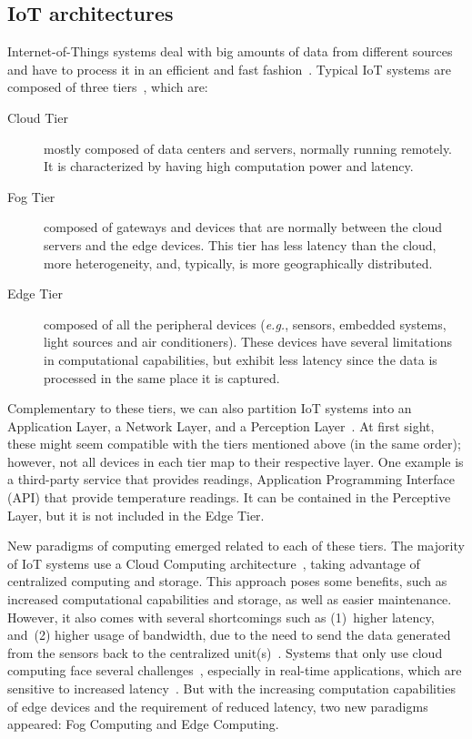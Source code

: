 \subsection{IoT architectures}\label{sec:architectures}

Internet-of-Things systems deal with big amounts of data from different sources and have to process it in an efficient and fast fashion~\cite{lin_survey}. Typical IoT systems are composed of three tiers~\cite{Yang2019}, which are:

\begin{description}
    \item[Cloud Tier] mostly composed of data centers and servers, normally running remotely. It is characterized by having high computation power and latency.
    \item[Fog Tier] composed of gateways and devices that are normally between the cloud servers and the edge devices. This tier has less latency than the cloud, more heterogeneity, and, typically, is more geographically distributed.
    \item[Edge Tier] composed of all the peripheral devices (\emph{e.g.}, sensors, embedded systems, light sources and air conditioners). These devices have several limitations in computational capabilities, but exhibit less latency since the data is processed in the same place it is captured.
\end{description}

Complementary to these tiers, we can also partition IoT systems into an Application Layer, a Network Layer, and a Perception Layer~\cite{iot_layers}. At first sight, these might seem compatible with the tiers mentioned above (in the same order); however, not all devices in each tier map to their respective layer. One example is a third-party service that provides readings, \eg Application Programming Interface (API) that provide temperature readings. It can be contained in the Perceptive Layer, but it is not included in the Edge Tier.

New paradigms of computing emerged related to each of these tiers. The majority of IoT systems use a Cloud Computing architecture~\cite{cisco}, taking advantage of centralized computing and storage. This approach poses some benefits, such as increased computational capabilities and storage, as well as easier maintenance. However, it also comes with several shortcomings such as (1)~higher latency, and~(2) higher usage of bandwidth, due to the need to send the data generated from the sensors back to the centralized unit(s)~\cite{connecting_fog_and_cloud}. Systems that only use cloud computing face several challenges~\cite{aazam2014cloud}, especially in real-time applications, which are sensitive to increased latency~\cite{latency_critical,EUC2018}. But with the increasing computation capabilities of edge devices and the requirement of reduced latency, two new paradigms appeared: Fog Computing and Edge Computing.

